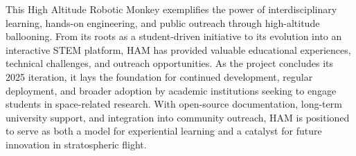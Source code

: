 This High Altitude Robotic Monkey exemplifies the power of interdisciplinary learning, hands-on engineering, and public outreach through high-altitude ballooning. From its roots as a student-driven initiative to its evolution into an interactive STEM platform, HAM has provided valuable educational experiences, technical challenges, and outreach opportunities. As the project concludes its 2025 iteration, it lays the foundation for continued development, regular deployment, and broader adoption by academic institutions seeking to engage students in space-related research. With open-source documentation, long-term university support, and integration into community outreach, HAM is positioned to serve as both a model for experiential learning and a catalyst for future innovation in stratospheric flight.